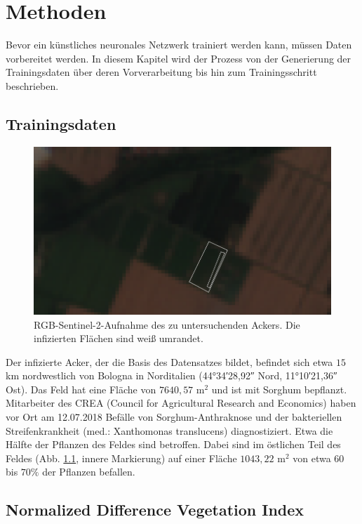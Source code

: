 \chapter{Methoden}\label{chap:methods}

Bevor ein künstliches neuronales Netzwerk trainiert werden kann, müssen Daten vorbereitet werden. In diesem Kapitel wird der Prozess von der Generierung der Trainingsdaten über deren Vorverarbeitung bis hin zum Trainingsschritt beschrieben.

\section{Trainingsdaten}\label{sec:data}
\begin{figure}[ht]
  \centering
  \includegraphics[width=.7\textwidth]{pics/roi.png}
  \caption[Region of Interest]{RGB-Sentinel-2-Aufnahme des zu untersuchenden Ackers. Die infizierten Flächen sind weiß umrandet. }
  \label{fig:roi}
\end{figure}

\noindent
Der infizierte Acker, der die Basis des Datensatzes bildet, befindet sich etwa $15$ km nordwestlich von Bologna in Norditalien (\ang{44;34;28,92} Nord, \ang{11;10;21,36} Ost). Das Feld hat eine Fläche von $7640,57$ m$^2$ und ist mit Sorghum bepflanzt. Mitarbeiter des CREA (Council for Agricultural Research and Economics) haben vor Ort am 12.07.2018 Befälle von Sorghum-Anthraknose und der bakteriellen Streifenkrankheit (med.: Xanthomonas translucens) diagnostiziert. Etwa die Hälfte der Pflanzen des Feldes sind betroffen. Dabei sind im östlichen Teil des Feldes (Abb. \ref{fig:roi}, innere Markierung) auf einer Fläche $1043,22$ m$^2$ von etwa $60$ bis $70\%$ der Pflanzen befallen.

\section{Normalized Difference Vegetation Index}\label{sec:ndvi}

